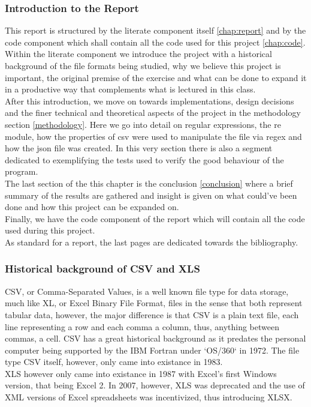 \documentclass[11pt,a4paper,times]{report}
\def\CSV{Comma-Separated Values\xspace}
\def\XLS{Excel Binary File Format\xspace}
\begin{document}
\subsubsection*{Introduction to the Report} This report is structured by the literate
component itself \ref{chap:report} and by the code component which shall contain
all the code used for this project \ref{chap:code}.
\\
Within the literate component we introduce the project with a historical background of the file formats
being studied, why we believe this project is important, the original premise of the exercise and what can be
done to expand it in a productive way that complements what is lectured in this class.
\\
After this introduction, we move on towards implementations, design decisions and the finer technical
and theoretical aspects of the project in the methodology section \ref{methodology}. Here we go into detail
on regular expressions, the re module, how the properties of csv were used to manipulate the file via regex
and how the json file was created.
In this very section there is also a segment dedicated to exemplifying the tests used to verify the good
behaviour of the program.
\\
The last section of the this chapter is the conclusion \ref{conclusion} where a brief summary of the results
are gathered and insight is given on what could've been done and how this project can be expanded on.
\\
Finally, we have the code component of the report which will contain all the code used during this project.
\\
As standard for a report, the last pages are dedicated towards the bibliography.

\subsubsection*{Historical background of CSV and XLS}CSV, or \CSV, is a well 
known file type for data storage, much like XL, or \XLS, files in the sense
that both represent tabular data, however, the major difference is that CSV is a plain text file,
each line representing a row and each comma a column, thus, anything between
commas, a cell. CSV has a great historical background as it predates 
the personal computer being supported by the IBM Fortran under `OS/360` in 1972.
The file type CSV itself, however, only came into existance in 1983.
\\
XLS however only came into existance in 1987 with Excel's first Windows version, that being Excel 2. In 2007, however,
XLS was deprecated and the use of XML versions of Excel spreadsheets was incentivized, thus introducing XLSX.
\end{document}
